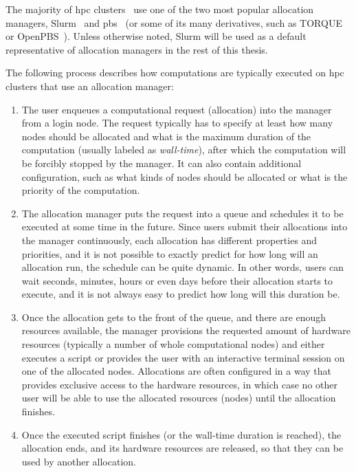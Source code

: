 The majority of \gls{hpc} clusters~\cite{slurm-schedmd} use one of the two
most popular allocation managers, Slurm~\cite{slurm} and
\gls{pbs}~\cite{pbs} (or some of its many derivatives,
such as TORQUE~\cite{torque} or OpenPBS~\cite{openpbs}). Unless otherwise noted, Slurm will be used
as a default representative of allocation managers in the rest of this thesis.

The following process describes how computations are typically executed on
\gls{hpc} clusters that use an allocation manager:

\begin{enumerate}
	\item The user enqueues a computational request (allocation) into the manager from a login node. The
	      request typically has to specify at least how many nodes should be allocated and what is the
	      maximum duration of the computation (usually labeled as \emph{wall-time}), after which
	      the computation will be forcibly stopped by the manager. It can also contain additional
	      configuration, such as what kinds of nodes should be allocated or what is the priority of the
	      computation.
	\item The allocation manager puts the request into a queue and schedules it to be executed at some time
	      in the future. Since users submit their allocations into the manager continuously, each allocation
	      has different properties and priorities, and it is not possible to exactly predict for how long
	      will an allocation run, the schedule can be quite dynamic. In other words, users can wait seconds,
	      minutes, hours or even days before their allocation starts to execute, and it is not always easy to
	      predict how long will this duration be.
	\item Once the allocation gets to the front of the queue, and there are enough resources available, the
	      manager provisions the requested amount of hardware resources (typically a number of whole
	      computational nodes) and either executes a script or provides the user with an interactive terminal
	      session on one of the allocated nodes. Allocations are often configured in a way that provides
	      exclusive access to the hardware resources, in which case no other user will be able to use the
	      allocated resources (nodes) until the allocation finishes.
	\item Once the executed script finishes (or the wall-time duration is reached), the allocation ends, and
	      its hardware resources are released, so that they can be used by another allocation.
\end{enumerate}

